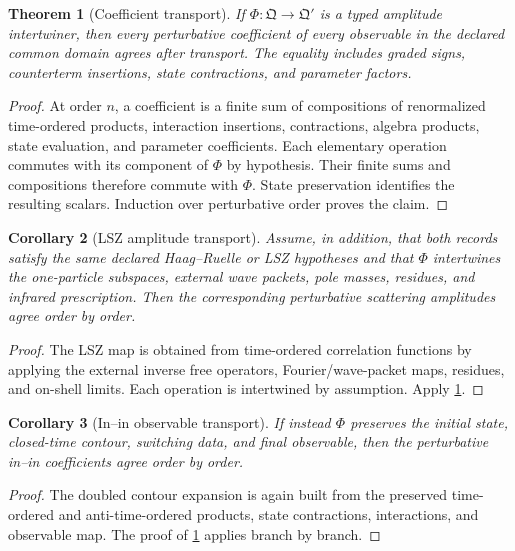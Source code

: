 \documentclass[11pt,a4paper]{article}
\numberwithin{equation}{section}
\newtheorem{theorem}{Theorem}[section]
\newtheorem{corollary}[theorem]{Corollary}
\theoremstyle{definition}
\theoremstyle{remark}
\begin{document}
\begin{theorem}[Coefficient transport]
\label{thm:transport}
If \(\Phi:\mathfrak Q\to\mathfrak Q'\) is a typed amplitude intertwiner,
then every perturbative coefficient of every observable in the declared
common domain agrees after transport.  The equality includes graded signs,
counterterm insertions, state contractions, and parameter factors.
\end{theorem}

\begin{proof}
At order \(n\), a coefficient is a finite sum of compositions of
renormalized time-ordered products, interaction insertions, contractions,
algebra products, state evaluation, and parameter coefficients.
Each elementary operation commutes with its component of \(\Phi\) by
hypothesis.  Their finite sums and compositions therefore commute with
\(\Phi\).  State preservation identifies the resulting scalars.  Induction
over perturbative order proves the claim.
\end{proof}

\begin{corollary}[LSZ amplitude transport]
\label{cor:lsz}
Assume, in addition, that both records satisfy the same declared
Haag--Ruelle or LSZ hypotheses and that \(\Phi\) intertwines the one-particle
subspaces, external wave packets, pole masses, residues, and infrared
prescription.  Then the corresponding perturbative scattering amplitudes
agree order by order.
\end{corollary}

\begin{proof}
The LSZ map is obtained from time-ordered correlation functions by applying
the external inverse free operators, Fourier/wave-packet maps, residues,
and on-shell limits.  Each operation is intertwined by assumption.
Apply \cref{thm:transport}.
\end{proof}

\begin{corollary}[In--in observable transport]
\label{cor:inin}
If instead \(\Phi\) preserves the initial state, closed-time contour,
switching data, and final observable, then the perturbative in--in
coefficients agree order by order.
\end{corollary}

\begin{proof}
The doubled contour expansion is again built from the preserved
time-ordered and anti-time-ordered products, state contractions,
interactions, and observable map.  The proof of
\cref{thm:transport} applies branch by branch.
\end{proof}
\end{document}
